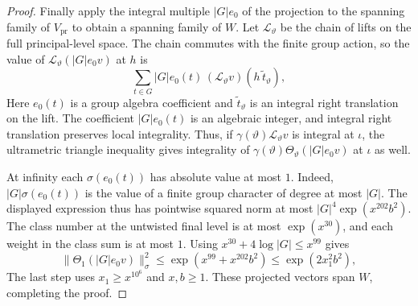 \begin{proof}
Finally apply the integral multiple $|G|e_0$ of the projection to the spanning family of $V_{\mathrm{pr}}$ to obtain a spanning family of $W$. Let $\mathcal L_\vartheta$ be the chain of lifts on the full principal-level space. The chain commutes with the finite group action, so the value of $\mathcal L_\vartheta(|G|e_0 v)$ at $h$ is
\[
 \sum_{t\in G} |G|e_0(t)\,
       (\mathcal L_\vartheta v)(h\,\widetilde t_\vartheta),
\]
Here $e_0(t)$ is a group algebra coefficient and $\widetilde t_\vartheta$ is an integral right translation on the lift. The coefficient $|G|e_0(t)$ is an algebraic integer, and integral right translation preserves local integrality. Thus, if $\gamma(\vartheta)\mathcal L_\vartheta v$ is integral at $\iota$, the ultrametric triangle inequality gives integrality of $\gamma(\vartheta)\Theta_\vartheta(|G|e_0 v)$ at $\iota$ as well.

At infinity each $\sigma(e_0(t))$ has absolute value at most $1$. Indeed, $|G|\sigma(e_0(t))$ is the value of a finite group character of degree at most $|G|$. The displayed expression thus has pointwise squared norm at most $|G|^4\exp(x^{202}b^2)$. The class number at the untwisted final level is at most $\exp(x^{30})$, and each weight in the class sum is at most $1$. Using $x^{30}+4\log |G|\le x^{99}$ gives
\[
 \|\Theta_1(|G|e_0 v)\|_\sigma^2
 \le \exp(x^{99}+x^{202}b^2)
 \le \exp(2x_1^2b^2),
\]
The last step uses $x_1\ge x^{10^6}$ and $x,b\ge1$. These projected vectors span $W$, completing the proof.
\end{proof}

